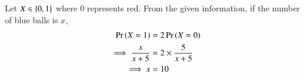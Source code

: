 Let $X \in \left\{0,1\right\}$ where 0 represents red.
From the given information, if the number of blue balls is $x$,
\begin{align}
\Pr\left(X = 1\right) &= 2 \Pr\left(X=0\right)
\\
\implies \frac{x}{x+5} &= 2\times \frac{5}{x+5}
\\
\implies x &=10
\end{align}
